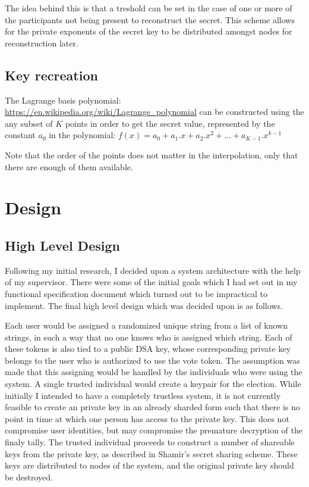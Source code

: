 \documentclass[a4paper,12pt]{article}
\begin{document}
The idea behind this is that a treshold can be set in the case of one or more of the participants not being present to reconstruct the secret. This scheme allows for the private exponents of the secret key to be distributed amongst nodes for reconstruction later.

\subsection{Key recreation}
The Lagrange basis polynomial:
\url{https://en.wikipedia.org/wiki/Lagrange_polynomial}
can be constructed using the any subset of \(K\) points in order to get the secret value, represented by the constant \(a_{0}\) in the polynomial:
\(
f(x) = a_{0} + a_{1}.x + a_{2}.x^{2} + ... + a_{K-1}.x^{k-1}
\)

Note that the order of the points does not matter in the interpolation, only that there are enough of them available.

\section{Design}
\subsection{High Level Design}
Following my initial research, I decided upon a system architecture with the help of my supervisor. There were some of the initial goals which I had set out in my functional specification document which turned out to be impractical to implement. The final high level design which was decided upon is as follows.

Each user would be assigned a randomized unique string from a list of known strings, in such a way that no one knows who is assigned which string. Each of these tokens is also tied to a public DSA key, whose corresponding private key belongs to the user who is authorized to use the vote token. The assumption was made that this assigning would be handled by the individuals who were using the system. A single trusted individual would create a keypair for the election. While initially I intended to have a completely trustless system, it is not currently feasible to create an private key in an already sharded form such that there is no point in time at which one person has access to the private key. This does not compromise user identities, but may compromise the premature decryption of the finaly tally. The trusted individual proceeds to construct a number of shareable keys from the private key, as described in Shamir's secret sharing scheme. These keys are distributed to nodes of the system, and the original private key should be destroyed.
\end{document}
